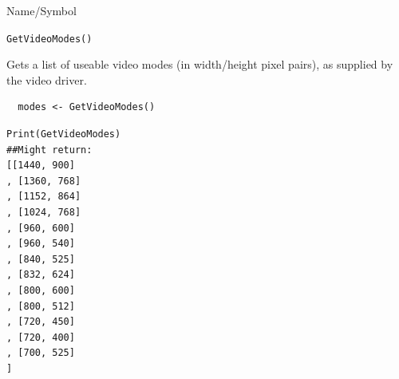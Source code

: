 \begin{desc}{Name/Symbol}
\item[Name/Symbol]	\verb+GetVideoModes()+

\item[Description] Gets a list of useable video modes (in width/height pixel pairs), as supplied by the video driver.

\item[Usage]
\begin{verbatim}
  modes <- GetVideoModes()
\end{verbatim}

\item[Example]
\begin{verbatim}
Print(GetVideoModes)
##Might return:
[[1440, 900]
, [1360, 768]
, [1152, 864]
, [1024, 768]
, [960, 600]
, [960, 540]
, [840, 525]
, [832, 624]
, [800, 600]
, [800, 512]
, [720, 450]
, [720, 400]
, [700, 525]
]
\end{verbatim}

\item[See Also]	
\end{desc}





